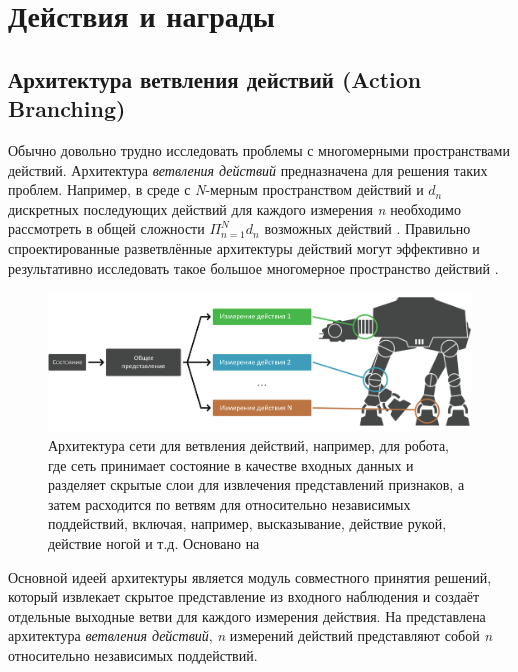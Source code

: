 \section{Действия и награды} \label{ch2:act-rew} %

\subsection{Архитектура ветвления действий (Action Branching)}

Обычно довольно трудно исследовать проблемы с многомерными пространствами действий. Архитектура \textit{ветвления действий} предназначена для решения таких проблем. Например, в среде с \textit{N}-мерным пространством действий и $d_n$ дискретных последующих действий для каждого измерения \textit{n} необходимо рассмотреть в общей сложности $\Pi^N_{n=1} d_n$ возможных действий \cite{tavakoli2017action}. Правильно спроектированные разветвлённые архитектуры действий могут эффективно и результативно исследовать такое большое многомерное пространство действий \cite{tavakoli2017action}.

\begin{figure}[ht!]
    \center
    \includegraphics [scale=0.4] {my_folder/images/ch2/action-branching.png}
    \caption{Архитектура сети для ветвления действий, например, для робота, где сеть принимает состояние в качестве входных данных и разделяет скрытые слои для извлечения представлений признаков, а затем расходится по ветвям для относительно независимых поддействий, включая, например, высказывание, действие рукой, действие ногой и т.д. Основано на \cite{tavakoli2017action}}
    \label{fig:ch2-action-branching}
\end{figure}

Основной идеей архитектуры является модуль совместного принятия решений, который извлекает скрытое представление из входного наблюдения и создаёт отдельные выходные ветви для каждого измерения действия. На  представлена архитектура \textit{ветвления действий}, \textit{n} измерений действий представляют собой \textit{n} относительно независимых поддействий.

